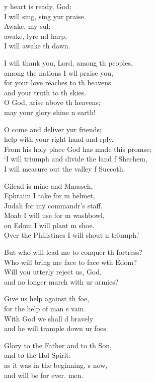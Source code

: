 \settowidth{\versewidth}{From his holy place God has made this promise; +}
\begin{psalmverse}%
  \begin{patverse}
y heart is ready,  God;\Med\\
I will sing, sing yur praise.\\
Awake, my sul;\Flex\\
awake, lyre nd harp,\Med\\
I will awake th dawn.

I will thank you, Lord, among th peoples,\Med\\
among the nations I w\pointup{\i}ll praise you,\\
for your love reaches to th heavens\Med\\
and your truth to th skies.\\
O God, arise above th heavens;\Med\\
may your glory shine n earth!

O come and deliver yur friends;\Med\\
help with your right hand and rply.\\
From his holy place God has made this prom\pointup{\i}se;\Flex\\
‘I will triumph and divide the land f Shechem,\\
I will measure out the valley f Succoth.

Gilead is mine and Mnasseh,\Med\\
Ephraim I take for m helmet,\\
Judah for my commandr’s staff.\Med\\
Moab I will use for m washbowl,\\
on Edom I will plant m shoe.\Med\\
Over the Philistines I will shout \pointup{\i}n triumph.’

But who will lead me to conquer th fortress?\Med\\
Who will bring me face to face w\pointup{\i}th Edom?\\
Will you utterly reject us,  God,\Med\\
and no longer march with ur armies?

Give us help against th foe,\Med\\
for the help of man \pointup{\i}s vain.\\
With God we shall d bravely\Med\\
and he will trample down ur foes.

Glory to the Father and to th Son,\Med\\
and to the Hol Spirit:\\
as it was in the beginning, \pointup{\i}s now,\Med\\
and will be for ever. men.
  \end{patverse}
  \end{psalmverse}
